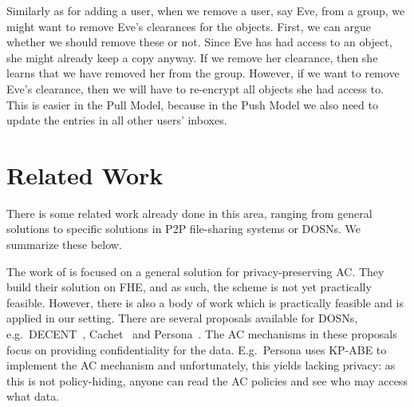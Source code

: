 Similarly as for adding a user, when we remove a user, say Eve, from a group, 
we might want to remove Eve's clearances for the objects.
First, we can argue whether we should remove these or not.
Since Eve has had access to an object, she might already keep a copy anyway.
If we remove her clearance, then she learns that we have removed her from the 
group.
However, if we want to remove Eve's clearance, then we will have to re-encrypt 
all objects she had access to.
This is easier in the Pull Model, because in the Push Model we also need to 
update the entries in all other users' inboxes.

%


\section<article>{Related Work}\label{RelatedWork}

There is some related work already done in this area, ranging from general 
solutions to specific solutions in \ac{P2P} file-sharing systems or \acp{DOSN}.
We summarize these below.

The work of \citet{TowardsPPACwHPHCHD} is focused on a general solution for 
privacy-preserving \ac{AC}.
They build their solution on \ac{FHE}, and as such, the scheme is not yet 
practically feasible.
However, there is also a body of work which is practically feasible and is 
applied in our setting.
There are several proposals available for \acp{DOSN}, e.g.\ 
DECENT~\cite{DECENT}, Cachet~\cite{Cachet} and Persona~\cite{Persona}.
The \ac{AC} mechanisms in these proposals focus on providing confidentiality 
for the data.
E.g.\ Persona uses \ac{KP-ABE} to implement the \ac{AC} mechanism and
unfortunately, this yields lacking privacy: as this is not policy-hiding, 
anyone can read the \ac{AC} policies and see who may access what data.

